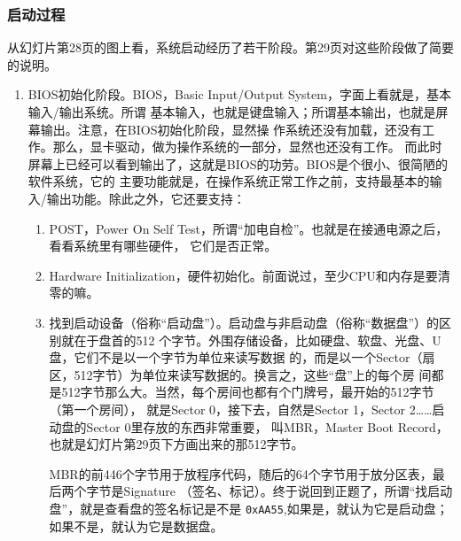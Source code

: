 \documentclass{wx672ctexart}
\newcommand\mpic[1]{%
  \marginpar{\texttt{[image: thumbnails/\#1]}}}
\begin{document}
\subsubsection{启动过程}
\label{sec:orgaac55c3}

从幻灯片第28页的图上看，系统启动经历了若干阶段。第29页对这些阶段做了简要的说明。\mpic{pg_0029}
\begin{enumerate}
\item BIOS初始化阶段。BIOS，Basic Input/Output System，字面上看就是，基本输入/输出系统。所谓
基本输入，也就是键盘输入；所谓基本输出，也就是屏幕输出。注意，在BIOS初始化阶段，显然操
作系统还没有加载，还没有工作。那么，显卡驱动，做为操作系统的一部分，显然也还没有工作。
而此时屏幕上已经可以看到输出了，这就是BIOS的功劳。BIOS是个很小、很简陋的软件系统，它的
主要功能就是，在操作系统正常工作之前，支持最基本的输入/输出功能。除此之外，它还要支持：
\begin{enumerate}
\item POST，Power On Self Test，所谓“加电自检”。也就是在接通电源之后，看看系统里有哪些硬件，
它们是否正常。
\item Hardware Initialization，硬件初始化。前面说过，至少CPU和内存是要清零的嘛。
\item 找到启动设备（俗称“启动盘”）。启动盘与非启动盘（俗称“数据盘”）的区别就在于盘首的512
个字节。外围存储设备，比如硬盘、软盘、光盘、U盘，它们不是以一个字节为单位来读写数据
的，而是以一个Sector（扇区，512字节）为单位来读写数据的。换言之，这些“盘”上的每个房
间都是512字节那么大。当然，每个房间也都有个门牌号，最开始的512字节（第一个房间），
就是Sector 0，接下去，自然是Sector 1，Sector 2……启动盘的Sector 0里存放的东西非常重要，
叫MBR，Master Boot Record，也就是幻灯片第29页下方画出来的那512字节。

MBR的前446个字节用于放程序代码，随后的64个字节用于放分区表，最后两个字节是Signature
（签名、标记）。终于说回到正题了，所谓“找启动盘”，就是查看盘的签名标记是不是
\texttt{0xAA55},如果是，就认为它是启动盘；如果不是，就认为它是数据盘。


\end{enumerate}
\end{enumerate}
\end{document}
